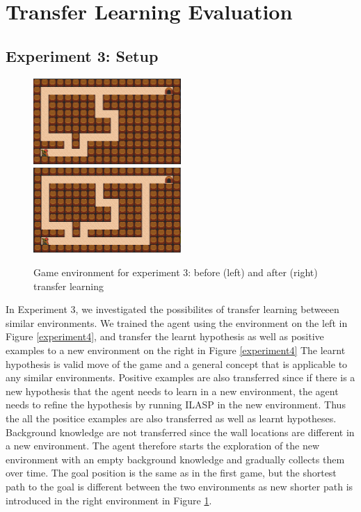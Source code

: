 \clearpage
\newpage
\section{Transfer Learning Evaluation}
\label{sec:transfer_learning_evaluation}

\subsection{Experiment 3: Setup}
\label{subsec:experiement3_setup}

\begin{figure}[!htb]
\centerline{
\includegraphics[width=0.5\textwidth]{./figures/experiment3_before}
\includegraphics[width=0.5\textwidth]{./figures/experiment3_after}
}
\caption{Game environment for experiment 3: before (left) and after (right) transfer learning}
\label{experiment3_setup}
\end{figure}

In Experiment 3, we investigated the possibilites of transfer learning betweeen similar environments.
We trained the agent using the environment on the left in Figure \ref{experiment4}, and transfer the learnt hypothesis as well as positive examples to a new environment on the right in Figure \ref{experiment4}
The learnt hypothesis is valid move of the game and a general concept that is applicable to any similar environments. Positive examples are also transferred since
if there is a new hypothesis that the agent needs to learn in a new environment, the agent needs to refine the hypothesis by running ILASP in the new environment.
Thus the all the positice examples are also transferred as well as learnt hypotheses. 
Background knowledge are not transferred since the wall locations are different in a new environment.
The agent therefore starts the exploration of the new environment with an empty background knowledge and gradually collects them over time.
The goal position is the same as in the first game, but the shortest path to the goal is different between the two environments as new shorter path is introduced in the right environment in Figure \ref{experiment3_setup}.

